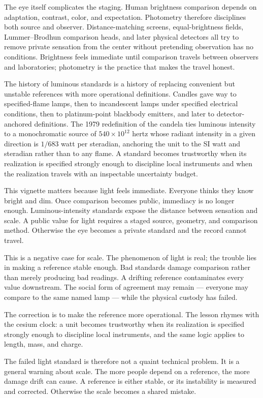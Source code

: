The eye itself complicates the staging. Human brightness comparison depends
on adaptation, contrast, color, and expectation. Photometry therefore
disciplines both source and observer. Distance-matching screens,
equal-brightness fields, Lummer--Brodhun comparison heads, and later
physical detectors all try to remove private sensation from the center
without pretending observation has no conditions. Brightness feels
immediate until comparison travels between observers and laboratories;
photometry is the practice that makes the travel honest.

The history of luminous standards is a history of replacing convenient but
unstable references with more operational definitions. Candles gave way to
specified-flame lamps, then to incandescent lamps under specified
electrical conditions, then to platinum-point blackbody emitters, and
later to detector-anchored definitions. The 1979 redefinition of the
candela ties luminous intensity to a monochromatic source of
\(540 \times 10^{12}\) hertz whose radiant intensity in a given direction is
\(1/683\) watt per steradian, anchoring the unit to the SI watt and steradian
rather than to any flame. A standard
becomes trustworthy when its realization is specified strongly enough to
discipline local instruments and when the realization travels with an
inspectable uncertainty budget.

This vignette matters because light feels immediate. Everyone thinks they
know bright and dim. Once comparison becomes public, immediacy is no
longer enough. Luminous-intensity standards expose the distance between
sensation and scale. A public value for light requires a staged source,
geometry, and comparison method. Otherwise the eye becomes a private
standard and the record cannot travel.

This is a negative case for scale. The phenomenon of light is real; the
trouble lies in making a reference stable enough. Bad standards damage
comparison rather than merely producing bad readings. A drifting reference
contaminates every value downstream. The social form of agreement may
remain --- everyone may compare to the same named lamp --- while the
physical custody has failed.

The correction is to make the reference more operational. The lesson
rhymes with the cesium clock: a unit becomes trustworthy when its
realization is specified strongly enough to discipline local instruments,
and the same logic applies to length, mass, and charge.

The failed light standard is therefore not a quaint technical problem. It
is a general warning about scale. The more people depend on a reference,
the more damage drift can cause. A reference is either stable, or its
instability is measured and corrected. Otherwise the scale becomes a
shared mistake.

